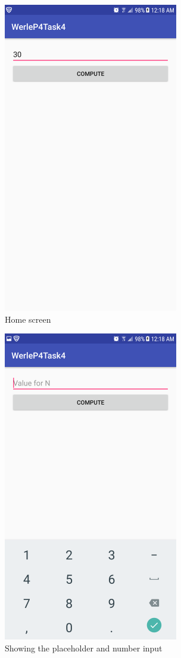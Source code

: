 \documentclass[11pt]{article}
\begin{document}
	\begin{figure}[ht]
		\includegraphics[width=3in]{img/t4s1.png}
		\centering
		\caption{Home screen}
	\end{figure}
	\begin{figure}[ht]
		\includegraphics[width=3in]{img/t4s2.png}
		\centering
		\caption{Showing the placeholder and number input}
	\end{figure}
\end{document}
